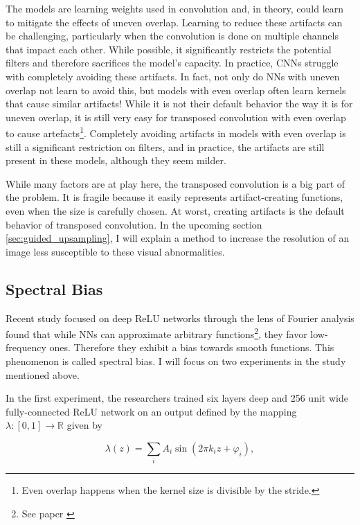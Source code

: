 The models are learning weights used in convolution and, in theory, could learn to mitigate the effects of uneven overlap. Learning to reduce these artifacts can be challenging, particularly when the convolution is done on multiple channels that impact each other. While possible, it significantly restricts the potential filters and therefore sacrifices the model's capacity. In practice, \glspl{CNN} struggle with completely avoiding these artifacts. In fact, not only do \glspl{NN} with uneven overlap not learn to avoid this, but models with even overlap often learn kernels that cause similar artifacts! While it is not their default behavior the way it is for uneven overlap, it is still very easy for transposed convolution with even overlap to cause artefacts\footnote{Even overlap happens when the kernel size is divisible by the stride.}. Completely avoiding artifacts in models with even overlap is still a significant restriction on filters, and in practice, the artifacts are still present in these models, although they seem milder.\cite{deconvolutionbias}

While many factors are at play here, the transposed convolution is a big part of the problem. It is fragile because it easily represents artifact-creating functions, even when the size is carefully chosen. At worst, creating artifacts is the default behavior of transposed convolution. In the upcoming section \ref{sec:guided_upsampling}, I will explain a method to increase the resolution of an image less susceptible to these visual abnormalities.

\subsection{Spectral Bias}
\label{subsec:spectral_bias}

Recent study \cite{spectralbias} focused on deep ReLU networks through the lens of Fourier analysis found that while \glspl{NN} can approximate arbitrary functions\footnote{See paper \cite{universalapproximators}}, they favor low-frequency ones. Therefore they exhibit a bias towards smooth functions. This phenomenon is called spectral bias. I will focus on two experiments in the study mentioned above.

In the first experiment, the researchers trained six layers deep and 256 unit wide fully-connected ReLU network on an output defined by the mapping $\lambda: [0, 1] \to \mathbb{R}$ given by

\begin{equation} \label{eq:experiment_1}
    \lambda(z) = \sum_i A_i \sin(2\pi k_i z + \varphi_i),
\end{equation}


